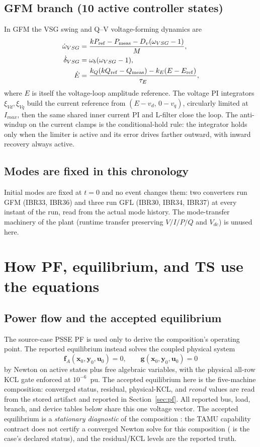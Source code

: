 \documentclass[12pt,a4paper]{article}
\newcommand{\vect}[1]{\boldsymbol{#1}}
\newcommand{\code}[1]{\texttt{\detokenize{#1}}}
\begin{document}
\subsection{GFM branch (10 active controller states)}

In GFM the VSG swing and Q--V voltage-forming dynamics are
\begin{align}
\dot\omega_{VSG}&=\frac{k P_{\rm ref}-P_{\rm meas}-D_v(\omega_{VSG}-1)}{M},\\
\dot\delta_{VSG}&=\omega_b(\omega_{VSG}-1),\\
\dot E&=\frac{k_Q(k Q_{\rm ref}-Q_{\rm meas})-k_E(E-E_{\rm ref})}{\tau_E},
\end{align}
where $E$ is itself the voltage-loop amplitude reference.  The voltage PI
integrators $\xi_{Vd},\xi_{Vq}$ build the current reference from
$(E-v_d,\,0-v_q)$, circularly limited at $I_{max}$, then the same shared
inner current PI and L-filter close the loop.  The anti-windup on the current
clamps is the conditional-hold rule: the integrator holds only when the
limiter is active and its error drives farther outward, with inward recovery
always active.

\subsection{Modes are fixed in this chronology}

Initial modes are fixed at $t=0$ and no event changes them: two converters run
GFM (IBR33, IBR36) and three run GFL (IBR30, IBR34, IBR37) at every instant of
the run, read from the actual mode history.  The mode-transfer machinery of the
plant (runtime transfer preserving $V/I/P/Q$ and $V_{dc}$) is unused here.

\section{How PF, equilibrium, and TS use the equations}\label{sec:tsform}

\subsection{Power flow and the accepted equilibrium}

The source-case PSSE PF is used only to derive the composition's operating
point.  The reported equilibrium instead solves the coupled physical system
\[
\vect f_A(\vect x_0,\vect y_0,\vect u_0)=0,\qquad
\vect g(\vect x_0,\vect y_0,\vect u_0)=0
\]
by Newton on active states plus free algebraic variables, with the physical
all-row KCL gate enforced at $10^{-6}$~pu.  The accepted equilibrium here is
the five-machine composition: converged status, residual, physical-KCL, and
$rcond$ values are read from the stored artifact and reported in
Section~\ref{sec:pf}.  All reported bus, load, branch, and device tables below
share this one voltage vector.  The accepted equilibrium is a
\emph{stationary diagnostic} of the composition \code{case_ne39_5sg_5ibr}: the
TAMU capability contract does not certify a converged Newton solve for this
composition (\code{eq.converged=false} is the case's declared status), and the
residual/KCL levels are the reported truth.
\end{document}
